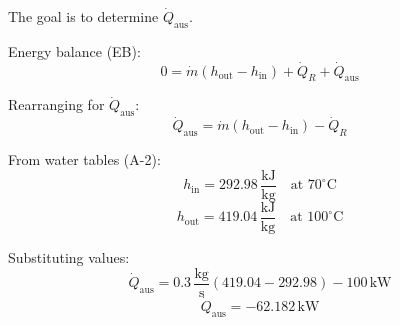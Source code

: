 The goal is to determine \( \dot{Q}_{\text{aus}} \).  

Energy balance (EB):  
\[
0 = \dot{m} \left( h_{\text{out}} - h_{\text{in}} \right) + \dot{Q}_R + \dot{Q}_{\text{aus}}
\]  

Rearranging for \( \dot{Q}_{\text{aus}} \):  
\[
\dot{Q}_{\text{aus}} = \dot{m} \left( h_{\text{out}} - h_{\text{in}} \right) - \dot{Q}_R
\]  

From water tables (A-2):  
\[
h_{\text{in}} = 292.98 \, \frac{\text{kJ}}{\text{kg}} \quad \text{at } 70^\circ\text{C}
\]  
\[
h_{\text{out}} = 419.04 \, \frac{\text{kJ}}{\text{kg}} \quad \text{at } 100^\circ\text{C}
\]  

Substituting values:  
\[
\dot{Q}_{\text{aus}} = 0.3 \, \frac{\text{kg}}{\text{s}} \left( 419.04 - 292.98 \right) - 100 \, \text{kW}
\]  
\[
\dot{Q}_{\text{aus}} = -62.182 \, \text{kW}
\]